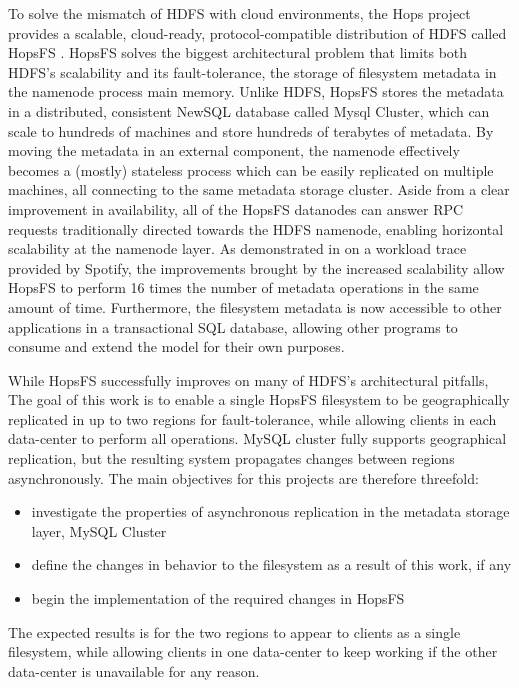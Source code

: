 To solve the mismatch of HDFS with cloud environments, the Hops project provides a scalable, cloud-ready, protocol-compatible distribution of HDFS called HopsFS \cite{DBLP:conf/dais/NiaziIBD15}.
HopsFS solves the biggest architectural problem that limits both HDFS's scalability and its fault-tolerance, the storage of filesystem metadata in the namenode process main memory.
Unlike HDFS, HopsFS stores the metadata in a distributed, consistent NewSQL database called Mysql Cluster, which can scale to hundreds of machines and store hundreds of terabytes of metadata.
By moving the metadata in an external component, the namenode effectively becomes a (mostly) stateless process which can be easily replicated on multiple machines, all connecting to the same metadata storage cluster.
Aside from a clear improvement in availability, all of the HopsFS datanodes can answer RPC requests traditionally directed towards the HDFS namenode, enabling horizontal scalability at the namenode layer.
As demonstrated in \cite{DBLP:conf/dais/NiaziIBD15} on a workload trace provided by Spotify, the improvements brought by the increased scalability allow HopsFS to perform 16 times the number of metadata operations in the same amount of time.
Furthermore, the filesystem metadata is now accessible to other applications in a transactional SQL database, allowing other programs to consume and extend the model for their own purposes.

While HopsFS successfully improves on many of HDFS's architectural pitfalls, 
The goal of this work is to enable a single HopsFS filesystem to be geographically replicated in up to two regions for fault-tolerance, while allowing clients in each data-center to perform all operations.
MySQL cluster fully supports geographical replication, but the resulting system propagates changes between regions asynchronously.
The main objectives for this projects are therefore threefold:
\begin{itemize}
    \item investigate the properties of asynchronous replication in the metadata storage layer, MySQL Cluster
    \item define the changes in behavior to the filesystem as a result of this work, if any
    \item begin the implementation of the required changes in HopsFS
\end{itemize}
The expected results is for the two regions to appear to clients as a single filesystem, while allowing clients in one data-center to keep working if the other data-center is unavailable for any reason.

